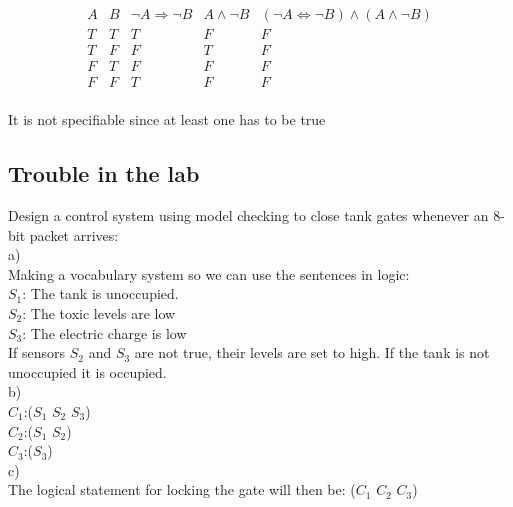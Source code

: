 \documentclass{article}
\begin{document}
\begin{displaymath}
\begin{array}{|c|c|c|c|c|c}

A & 
B & 
\neg A \Rightarrow \neg B & 
A \wedge \neg B &
(\neg A \Leftrightarrow \neg B) \wedge (A \wedge \neg B)\\ %
\hline  %
T & T & T & F & F\\
T & F & F & T & F\\
F & T & F & F & F\\
F & F & T & F & F\\


\end{array}
\end{displaymath}


It is not specifiable since at least one has to be true\\


\subsection{Trouble in the lab}


Design a control system using model checking to close tank gates whenever an 8-bit packet arrives:\\

a)\\
Making a vocabulary system so we can use the sentences in logic:\\
$S_1$: The tank is unoccupied.\\
$S_2$: The toxic levels are low\\
$S_3$: The electric charge is low\\

\noindent If sensors $S_2$ and $S_3$ are not true, their levels are set to high. If the tank is not unoccupied it is occupied.\\

b)\\
$C_1$:(\neg $S_1$ \wedge $S_2$ \wedge $S_3$)\\
$C_2$:($S_1$ \wedge \neg $S_2$)\\
$C_3$:(\neg $S_3$)\\

c)\\
The logical statement for locking the gate will then be: ($C_1$ \vee $C_2$ \vee $C_3$)\\
\end{document}
